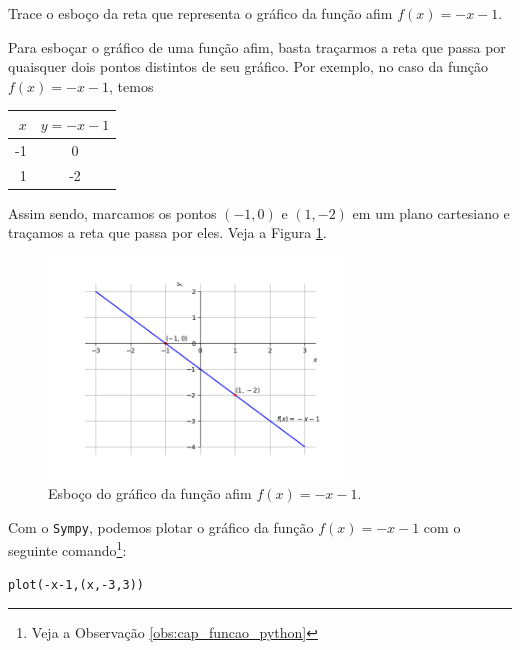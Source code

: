 \begin{exeresol}
Trace o esboço da reta que representa o gráfico da função afim $f(x) = -x-1$.  
\end{exeresol}
\begin{resol}
  Para esboçar o gráfico de uma função afim, basta traçarmos a reta que passa por quaisquer dois pontos distintos de seu gráfico. Por exemplo, no caso da função $f(x) = -x -1$, temos
  \begin{center}
  \begin{tabular}[H]{r|c}
    $x$ & $y = -x-1$\\\hline
    -1  & 0\\
    1   & -2\\\hline
  \end{tabular}
\end{center}
Assim sendo, marcamos os pontos $(-1, 0)$ e $(1, -2)$ em um plano cartesiano e traçamos a reta que passa por eles. Veja a Figura \ref{fig:exeresol_funafim_grafico}.

\begin{figure}[H]
  \centering
  \includegraphics[width=0.7\textwidth]{./cap_funcao/dados/fig_exeresol_funafim_grafico/fig_exeresol_funafim_grafico}
  \caption{Esboço do gráfico da função afim $f(x)=-x-1$.}
  \label{fig:exeresol_funafim_grafico}
\end{figure}

\ifispython
Com o \verb+Sympy+, podemos plotar o gráfico da função $f(x)=-x-1$ com o seguinte comando\footnote{Veja a Observação \ref{obs:cap_funcao_python}}:
\begin{verbatim}
plot(-x-1,(x,-3,3))
\end{verbatim}
\fi
\end{resol}

